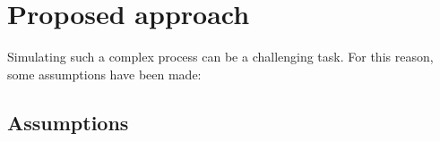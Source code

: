 \documentclass[conference]{IEEEtran}
\begin{document}


\section{Proposed approach}

    Simulating such a complex process can be a challenging task. For this reason, some assumptions have been made:

    \subsection{Assumptions}
\end{document}
